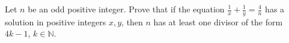 Let $n$ be an odd positive integer. Prove that if the equation $\frac1x+\frac1y=\frac4n$ has a solution in positive integers $x,y$, then $n$ has at least one divisor of the form $4k-1$, $k\in\mathbb N$.